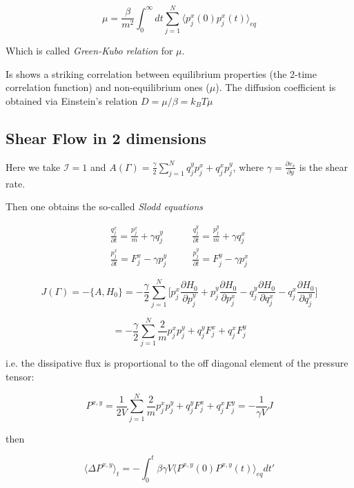 \documentclass{article}
\begin{document}
\begin{equation}
\mu =  \frac{\beta}{ m^2} \int_{0}^{\infty} dt  \sum_{j=1}^{N} \langle p^x_j(0) p^x_j(t)  \rangle_{eq} 
\end{equation}

Which is called \emph{Green-Kubo relation} for $\mu$.

Is shows a striking correlation between equilibrium properties (the 2-time correlation function) and non-equilibrium ones ($\mu$). The diffusion coefficient is obtained via Einstein's relation $D = \mu / \beta = k_B T \mu$

\subsection{Shear Flow in 2 dimensions}

Here we take $\mathcal{I} = 1$ and $A(\Gamma)= \frac{\gamma}{2} \sum_{j=1}^{N} q^y_j p^x_j + q^x_j p^y_j$, where $\gamma = \frac{\partial v_x}{\partial y}$ is the shear rate.

Then one obtains the so-called \emph{Slodd equations}

\begin{eqnarray*}
 \frac{q^x_j}{\partial t} = \frac{p^x_j}{m} + \gamma q^y_j &\quad&  \frac{q^y_j}{\partial t} = \frac{p^y_j}{m} + \gamma q^x_j \\
 \frac{p^x_j}{\partial t} =  F^x_j - \gamma p^y_j &\quad&  \frac{p^y_j}{\partial t} = F^y_j - \gamma p^x_j
\end{eqnarray*}

\begin{equation}
J(\Gamma) = - \{ A, H_0 \} = -\frac{\gamma}{2} \sum_{j=1}^{N} \big [ p^x_j \frac{\partial H_0}{\partial p^y_j} + p^y_j \frac{\partial H_0}{\partial p^x_j} - q^y_j \frac{\partial H_0}{\partial q^x_j} - q^x_j \frac{\partial H_0}{\partial q^y_j}  \big]
\end{equation}

$$ = -\frac{\gamma}{2} \sum_{j=1}^{N} \frac{2}{m} p^x_j p^y_j + q^y_j F^x_j + q^x_j F^y_j $$

i.e. the dissipative flux is proportional to the off diagonal element of the pressure tensor:

$$ P^{x,y} = \frac{1}{2V}  \sum_{j=1}^{N} \frac{2}{m} p^x_j p^y_j + q^y_j F^x_j + q^x_j F^y_j= - \frac{1}{\gamma V} J $$

then

\begin{equation}
\langle \Delta P^{x,y} \rangle_t = - \int_{0}^{t} \beta \gamma V \langle P^{x,y}(0) P^{x,y}(t) \rangle_{eq} dt'
\end{equation}
\end{document}
